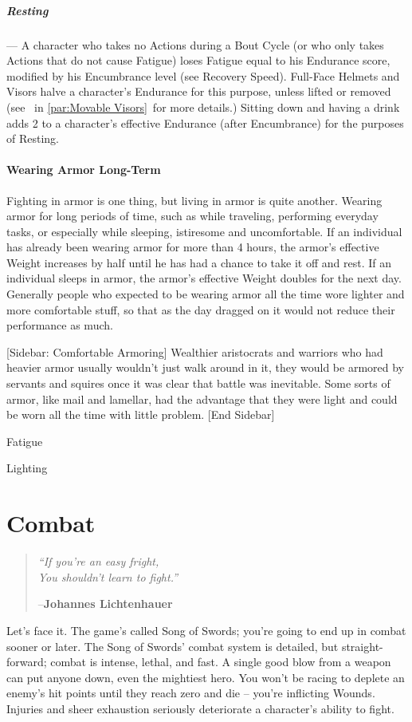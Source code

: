 \documentclass[oneside,11pt,english]{book}
\begin{document}
\paragraph{Resting}---\quad
A character who takes no Actions during a Bout Cycle (or who only takes Actions that do not cause 
Fatigue) loses Fatigue equal to his Endurance score, modified by his Encumbrance level (see Recovery 
Speed). Full-Face Helmets and Visors halve a character’s Endurance for this purpose, unless lifted or
removed (see ~in \autoref{par:Movable Visors}~for more details.)
Sitting down and having a drink adds 2 to a character’s effective Endurance (after Encumbrance) for the 
purposes of Resting. 


\subsubsection{Wearing Armor Long-Term}
Fighting in armor is one thing, but living in armor is quite another. Wearing armor for long periods of 
time, such as while traveling, performing everyday tasks, or especially while sleeping, istiresome and 
uncomfortable. 
If an individual has already been wearing armor for more than 4 hours, the armor’s effective Weight 
increases by half until he has had a chance to take it off and rest. 
If an individual sleeps in armor, the armor’s effective Weight doubles for the next day. 
Generally people who expected to be wearing armor all the time wore lighter and more comfortable stuff, 
so that as the day dragged on it would not reduce their performance as much. 


[Sidebar: Comfortable Armoring] 
Wealthier aristocrats and warriors who had heavier armor usually wouldn’t just walk around in it, they 
would be armored by servants and squires once it was clear that battle was inevitable. Some sorts of 
armor, like mail and lamellar, had the advantage that they were light and could be worn all the time with 
little problem. 
[End Sidebar] 

Fatigue 

Lighting 

\chapter{Combat}\label{ch:combat}
\startcontents[chapters]
\clearpage
\begin{quote}
	\centering
		\emph{“If you’re an easy fright,\\
			You shouldn’t learn to fight.”}\par
		\hfill--\textbf{Johannes Lichtenhauer}
\end{quote}
Let’s face it. The game’s called Song of Swords; you’re going to end up in combat sooner or later. The
Song of Swords’ combat system is detailed, but straight-forward; combat is intense, lethal, and fast. A
single good blow from a weapon can put anyone down, even the mightiest hero. You won’t be racing to
deplete an enemy’s hit points until they reach zero and die -- you’re inflicting Wounds. Injuries and sheer
exhaustion seriously deteriorate a character’s ability to fight.
\end{document}
